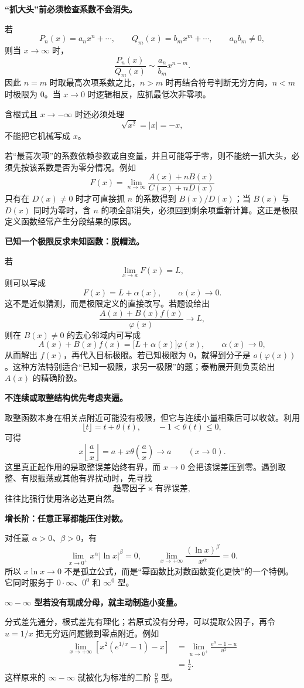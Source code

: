 \begin{knowledgeBox}
\textbf{“抓大头”前必须检查系数不会消失。}

若
\[
P_n(x)=a_nx^n+\cdots,\qquad
Q_m(x)=b_mx^m+\cdots,\qquad a_nb_m\ne0,
\]
则当 \(x\to\infty\) 时，
\[
\frac{P_n(x)}{Q_m(x)}
\sim\frac{a_n}{b_m}x^{n-m}.
\]
因此 \(n=m\) 时取最高次项系数之比，\(n>m\) 时再结合符号判断无穷方向，\(n<m\) 时极限为 \(0\)。当 \(x\to0\) 时逻辑相反，应抓最低次非零项。

含根式且 \(x\to-\infty\) 时还必须处理
\[
\sqrt{x^2}=|x|=-x,
\]
不能把它机械写成 \(x\)。

若“最高次项”的系数依赖参数或自变量，并且可能等于零，则不能统一抓大头，必须先按该系数是否为零分情况。例如
\[
F(x)=\lim_{n\to\infty}
\frac{A(x)+nB(x)}{C(x)+nD(x)}
\]
只有在 \(D(x)\ne0\) 时才可直接抓 \(n\) 的系数得到 \(B(x)/D(x)\)；当 \(B(x)\) 与 \(D(x)\) 同时为零时，含 \(n\) 的项全部消失，必须回到剩余项重新计算。这正是极限定义函数经常产生分段结果的原因。

\textbf{已知一个极限反求未知函数：脱帽法。}

若
\[
\lim_{x\to a}F(x)=L,
\]
则可以写成
\[
F(x)=L+\alpha(x),\qquad \alpha(x)\to0.
\]
这不是近似猜测，而是极限定义的直接改写。若题设给出
\[
\frac{A(x)+B(x)f(x)}{\varphi(x)}\to L,
\]
则在 \(B(x)\ne0\) 的去心邻域内可写成
\[
A(x)+B(x)f(x)
=\bigl[L+\alpha(x)\bigr]\varphi(x),
\qquad \alpha(x)\to0,
\]
从而解出 \(f(x)\)，再代入目标极限。若已知极限为 \(0\)，就得到分子是 \(o(\varphi(x))\)。这种方法特别适合“已知一极限，求另一极限”的题；泰勒展开则负责给出 \(A(x)\) 的精确阶数。

\textbf{不连续或取整结构优先考虑夹逼。}

取整函数本身在相关点附近可能没有极限，但它与连续小量相乘后可以收敛。利用
\[
\lfloor t\rfloor=t+\theta(t),
\qquad -1<\theta(t)\le0,
\]
可得
\[
x\left\lfloor\frac{a}{x}\right\rfloor
=a+x\theta\left(\frac{a}{x}\right)\to a
\qquad (x\to0).
\]
这里真正起作用的是取整误差始终有界，而 \(x\to0\) 会把该误差压到零。遇到取整、有限振荡或其他有界扰动时，先寻找
\[
\text{趋零因子}\times\text{有界误差},
\]
往往比强行使用洛必达更自然。

\textbf{增长阶：任意正幂都能压住对数。}

对任意 \(\alpha>0\)、\(\beta>0\)，有
\[
\lim_{x\to0^+}x^\alpha|\ln x|^\beta=0,
\qquad
\lim_{x\to+\infty}\frac{(\ln x)^\beta}{x^\alpha}=0.
\]
所以 \(x\ln x\to0\) 不是孤立公式，而是“幂函数比对数函数变化更快”的一个特例。它同时服务于 \(0\cdot\infty\)、\(0^0\) 和 \(\infty^0\) 型。

\textbf{\(\infty-\infty\) 型若没有现成分母，就主动制造小变量。}

分式差先通分，根式差先有理化；若原式没有分母，可以提取公因子，再令 \(u=1/x\) 把无穷远问题搬到零点附近。例如
\[
\begin{aligned}
\lim_{x\to+\infty}
\left[x^2\left(e^{1/x}-1\right)-x\right]
&=\lim_{u\to0^+}
\frac{e^u-1-u}{u^2}\\
&=\frac12.
\end{aligned}
\]
这样原来的 \(\infty-\infty\) 就被化为标准的二阶 \(\frac00\) 型。


\end{knowledgeBox}
